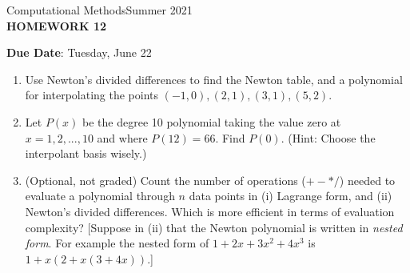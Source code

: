 \documentclass[12pt]{article}
\begin{document}
\begin{center}
Computational Methods\qquad Summer 2021
\\

\textbf{\large HOMEWORK 12}\\
\end{center}
\noindent \textbf{Due Date}: Tuesday, June 22\\

\begin{enumerate}
\item Use Newton's divided differences to find the Newton table, and a polynomial for interpolating the points $(-1,0),(2,1),(3,1),(5,2)$.
\item Let $P(x)$ be the degree 10 polynomial taking the value zero at  $x=1,2,...,10$ and where $P(12)=66$. Find $P(0)$. (Hint: Choose the interpolant basis wisely.)
\item (Optional, not graded) Count the number of operations ($+-*/$) needed to evaluate a polynomial through $n$ data points in (i) Lagrange form, and (ii) Newton's divided differences. Which is more efficient in terms of evaluation complexity? [Suppose in (ii) that the Newton polynomial is written in \emph{nested form}. For example the nested form of $1+2x+3x^2+4x^3$ is $1+x(2+x(3+4x))$.]
\end{enumerate}
\end{document}
